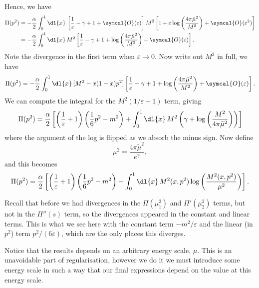 \documentclass[fleqn]{NotesClass}
\newcommand{\order}{\symcal{O}}
\begin{document}
    Hence, we have
    \begin{align}
        \Pi(p^2) &= -\frac{\alpha}{2} \int_0^1 \dl{x} \, \left[ \frac{1}{\varepsilon} - \gamma + 1 + \order(\varepsilon) \right] M^2 \left[ 1 + \varepsilon \log\left( \frac{4\pi\tilde{\mu}^2}{M^2} \right) + \order(\varepsilon^2) \right] \notag\\
        &= -\frac{\alpha}{2} \int_0^1 \dl{x} \, M^2 \left[ \frac{1}{\varepsilon} - \gamma + 1 + \log\left( \frac{4\pi\tilde{\mu}^2}{M^2} \right) + \order(\varepsilon) \right].
    \end{align}
    Note the divergence in the first term when \(\varepsilon \to 0\).
    Now write out \(M^2\) in full, we have
    \begin{equation}
        \Pi(p^2) = -\frac{\alpha}{2} \int_0^1 \dl{x} \, [M^2 - x(1 - x)p^2] \left[ \frac{1}{\varepsilon} - \gamma + 1 + \log\left( \frac{4\pi\tilde{\mu}^2}{M^2} \right) + \order(\varepsilon) \right].
    \end{equation}
    We can compute the integral for the \(M^2(1/\varepsilon + 1)\) term, giving
    \begin{equation}
        \Pi(p^2) = \frac{\alpha}{2} \left[ \left( \frac{1}{\varepsilon} + 1 \right)\left( \frac{1}{6}p^2 - m^2 \right) + \int_0^1 \dl{x} \, M^2 \left( \gamma + \log\left( \frac{M^2}{4\pi\tilde{\mu}^2} \right) \right) \right]
    \end{equation}
    where the argument of the log is flipped as we absorb the minus sign.
    Now define
    \begin{equation}
        \mu^2 = \frac{4\pi\tilde{\mu}^2}{e^\gamma},
    \end{equation}
    and this becomes
    \begin{equation}
        \Pi(p^2) = \frac{\alpha}{2} \left[ \left( \frac{1}{\varepsilon} + 1 \right)\left( \frac{1}{6}p^2 - m^2 \right) + \int_0^1 \dl{x} \, M^2(x, p^2) \log\left( \frac{M^2(x, p^2)}{\mu^2} \right) \right].
    \end{equation}
    
    Recall that before we had divergences in the \(\Pi(\mu_1^2)\) and \(\Pi'(\mu_2^2)\) terms, but not in the \(\Pi''(s)\) term, so the divergences appeared in the constant and linear terms.
    This is what we see here with the constant term \(-m^2/\varepsilon\) and the linear (in \(p^2\)) term \(p^2/(6\varepsilon)\), which are the only places this diverges.
    
    Notice that the results depends on an arbitrary energy scale, \(\mu\).
    This is an unavoidable part of regularisation, however we do it we must introduce some energy scale in such a way that our final expressions depend on the value at this energy scale.
    
\end{document}
